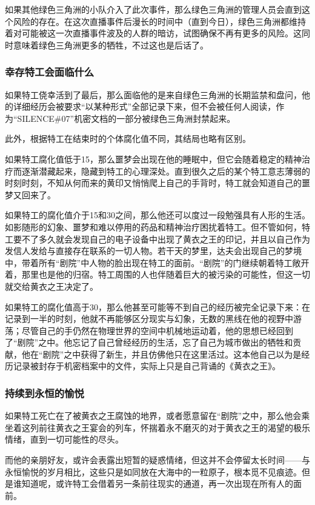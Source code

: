 如果其他绿色三角洲的小队介入了此次事件，那么绿色三角洲的管理人员会直到这个风险的存在。在这次直播事件后漫长的时间中（直到今日），绿色三角洲都维持着对可能被这一次直播事件波及的人群的暗访，试图确保不再有更多的风险。这同时意味着绿色三角洲更多的牺牲，不过这也是后话了。


\subsubsection{幸存特工会面临什么}

如果特工侥幸活到了最后，那么面临他的是来自绿色三角洲的长期监禁和盘问，他的详细经历会被要求“以某种形式”全部记录下来，但不会被任何人阅读，作为“SILENCE\#07”机密文档的一部分被绿色三角洲封禁起来。

此外，根据特工在结束时的个体腐化值不同，其结局也略有区别。

如果特工腐化值低于15，那么噩梦会出现在他的睡眠中，但它会随着稳定的精神治疗而逐渐潜藏起来，隐藏到特工的心理深处。直到很久之后的某个特工意志薄弱的时刻时刻，不知从何而来的黄印又悄悄爬上自己的手背时，特工就会知道自己的噩梦又回来了。

如果特工的腐化值介于15和30之间，那么他还可以度过一段勉强具有人形的生活。如影随形的幻象、噩梦和难以停用的药品和精神治疗困扰着特工。但不管如何，特工要不了多久就会发现自己的电子设备中出现了黄衣之王的印记，并且以自己作为发信人发给与直接存在联系的一切人物。若干天的梦里，达夫会出现自己的梦境中，带着所有“剧院”中人物的脸出现在特工的面前。“剧院”的门继续朝着特工敞开着，那里也是他的归宿。特工周围的人也伴随着巨大的被污染的可能性，但这一切就交给黄衣之王决定了。

如果特工的腐化值高于30，那么他甚至可能等不到自己的经历被完全记录下来：在记录到一半的时刻，他就不再能够区分现实与幻象，无数的黑线在他的视野中游荡；尽管自己的手仍然在物理世界的空间中机械地运动着，他的思想已经回到了“剧院”之中。他忘记了自己曾经经历的生活，忘了自己为城市做出的牺牲和贡献，他在“剧院”之中获得了新生，并且仿佛他只在这里活过。这本他自己以为是经历记录被封存于机密档案中的文件，实际上只是自己背诵的《黄衣之王》。

\subsubsection{持续到永恒的愉悦}

如果特工死亡在了被黄衣之王腐蚀的地界，或者愿意留在“剧院”之中，那么他会乘坐着这列前往黄衣之王宴会的列车，怀揣着永不磨灭的对于黄衣之王的渴望的极乐情绪，直到一切可能性的尽头。

而他的亲朋好友，或许会表露出短暂的疑惑情绪，但这并不会停留太长时间——与永恒愉悦的岁月相比，这些只是如同放在大海中的一粒原子，根本觅不见痕迹。但是谁知道呢，或许特工会借着另一条前往现实的通道，再一次出现在所有人的面前。
